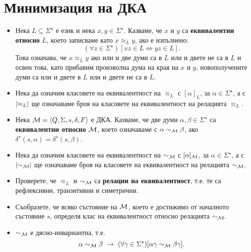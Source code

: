\newpage
\section{Минимизация на ДКА}


\begin{itemize}
\item
  Нека $L \subseteq \Sigma^\star$ е език и нека $x,y \in \Sigma^\star$.
  Казваме, че $x$ и $y$ са {\bf еквивалентни относно} $L$, което записваме 
  като $x \approx_L y$, ако е изпълнено:
  \[(\forall z \in \Sigma^\star)[xz \in L \iff yz \in L].\]
  Това означава, че $x\approx_L y$ ако или и две думи са в $L$ или и двете не са в $L$
  и освен това, като прибавим произволна дума на края на $x$ и $y$, новополучените
  думи са или и двете в $L$ или и двете не са в $L$.  
\item
  Нека да означим класовете на еквивалентност на $\approx_L$ с $[\alpha]_L$, за $\alpha \in \Sigma^\star$,
  а с $\lvert{\approx_L}\rvert$ ще означаваме броя на класовете на еквивалентност на релацията $\approx_L$.
\item
  Нека $\mathcal{M} = \langle{Q,\Sigma,s,\delta,F}\rangle$ е ДКА.
  Казваме, че две думи $\alpha,\beta \in \Sigma^\star$ са {\bf еквивалентни относно $\mathcal{M}$},
  което означаваме с $\alpha \sim_{\mathcal{M}} \beta$, ако $\delta^\star(s,\alpha) = \delta^\star(s,\beta)$.
\item
  Нека да означим класовете на еквивалентност на $\sim_{\mathcal{M}}$ с $[\alpha]_{\mathcal{M}}$, за $\alpha \in \Sigma^\star$,
  а с $\lvert{\sim_{\mathcal{M}}}\rvert$ ще означаваме броя на класовете на еквивалентност на релацията $\sim_{\mathcal{M}}$.
\item
  Проверете, че $\approx_L$ и $\sim_{\mathcal{M}}$ са {\bf релации на еквивалентност}, т.е.
  те са рефлексивни, транзитивни и симетрични.
\item
  Съобразете, че всяко състояние на $\mathcal{M}$, което е достижимо от началното състояние $s$, определя клас на еквивалентност относно 
  релацията $\sim_{\mathcal{M}}$.  
\item
  $\sim_{\mathcal{M}}$ е дясно-инвариантна, т.е.
  \[\alpha \sim_\M \beta\ \rightarrow\ (\forall \gamma\in\Sigma^\star)[\alpha\gamma \sim_\M \beta\gamma].\]
\end{itemize}

